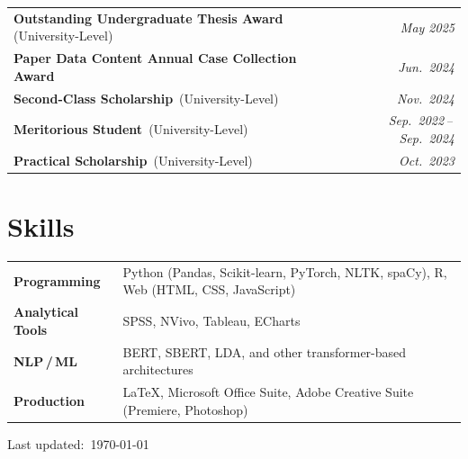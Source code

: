 \documentclass[a4paper,11pt]{article}
\renewcommand{\arraystretch}{1.2} %
\begin{document}
\noindent\begin{tabularx}{\linewidth}{@{}X r@{}}
  \textbf{Outstanding Undergraduate Thesis Award} \,{\small\color{muted}(University-Level)} & {\small\color{muted}\itshape May 2025} \\[3pt]
  \textbf{Paper Data Content Annual Case Collection Award} & {\small\color{muted}\itshape Jun.\ 2024} \\[3pt]
  \textbf{Second-Class Scholarship} \,{\small\color{muted}(University-Level)} & {\small\color{muted}\itshape Nov.\ 2024} \\[3pt]
  \textbf{Meritorious Student} \,{\small\color{muted}(University-Level)} & {\small\color{muted}\itshape Sep.\ 2022\,--\,Sep.\ 2024} \\[3pt]
  \textbf{Practical Scholarship} \,{\small\color{muted}(University-Level)} & {\small\color{muted}\itshape Oct.\ 2023} \\
\end{tabularx}

\section{Skills}

{\renewcommand{\arraystretch}{1.4}
\noindent\begin{tabularx}{\linewidth}{@{}>{\bfseries\color{accent}}l X@{}}
  Programming      & Python {\small\color{muted}(Pandas, Scikit-learn, PyTorch, NLTK, spaCy)}, R, Web {\small\color{muted}(HTML, CSS, JavaScript)} \\[2pt]
  Analytical Tools & SPSS, NVivo, Tableau, ECharts \\[2pt]
  NLP\,/\,ML       & BERT, SBERT, LDA, and other transformer-based architectures \\[2pt]
  Production       & \LaTeX, Microsoft Office Suite, Adobe Creative Suite {\small\color{muted}(Premiere, Photoshop)} \\
\end{tabularx}%
}

\vfill
\begin{center}{\scriptsize\color{muted}Last updated:\ \today}\end{center}
\end{document}
